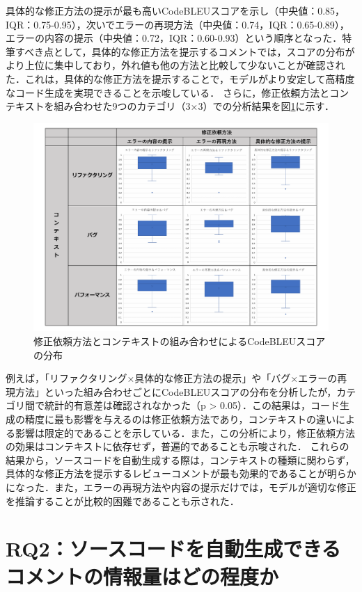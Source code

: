 \documentclass[11pt]{jreport}
\newcommand{\RQtwo}{ソースコードを自動生成できるコメントの情報量はどの程度か}
\begin{document}
具体的な修正方法の提示が最も高いCodeBLEUスコアを示し（中央値：0.85，IQR：0.75-0.95），次いでエラーの再現方法（中央値：0.74，IQR：0.65-0.89），エラーの内容の提示（中央値：0.72，IQR：0.60-0.93）という順序となった．特筆すべき点として，具体的な修正方法を提示するコメントでは，スコアの分布がより上位に集中しており，外れ値も他の方法と比較して少ないことが確認された．これは，具体的な修正方法を提示することで，モデルがより安定して高精度なコード生成を実現できることを示唆している．
さらに，修正依頼方法とコンテキストを組み合わせた9つのカテゴリ（3×3）での分析結果を図\ref{fig:matrix-score}に示す．
\begin{figure}[htbp]
\centering
\includegraphics[width=0.9\linewidth]{@BSthesis2024_Akamatsu/Akamatsu_figs/rq1_result01.pdf}
\caption{修正依頼方法とコンテキストの組み合わせによるCodeBLEUスコアの分布}
\label{fig:matrix-score}
\end{figure}
例えば，「リファクタリング×具体的な修正方法の提示」や「バグ×エラーの再現方法」といった組み合わせごとにCodeBLEUスコアの分布を分析したが，カテゴリ間で統計的有意差は確認されなかった（p > 0.05）．この結果は，コード生成の精度に最も影響を与えるのは修正依頼方法であり，コンテキストの違いによる影響は限定的であることを示している．また，この分析により，修正依頼方法の効果はコンテキストに依存せず，普遍的であることも示唆された．
これらの結果から，ソースコードを自動生成する際は，コンテキストの種類に関わらず，具体的な修正方法を提示するレビューコメントが最も効果的であることが明らかになった．また，エラーの再現方法や内容の提示だけでは，モデルが適切な修正を推論することが比較的困難であることも示された．


\chapter{RQ2：\RQtwo}\label{chap:fig-tab-exp}
\end{document}
